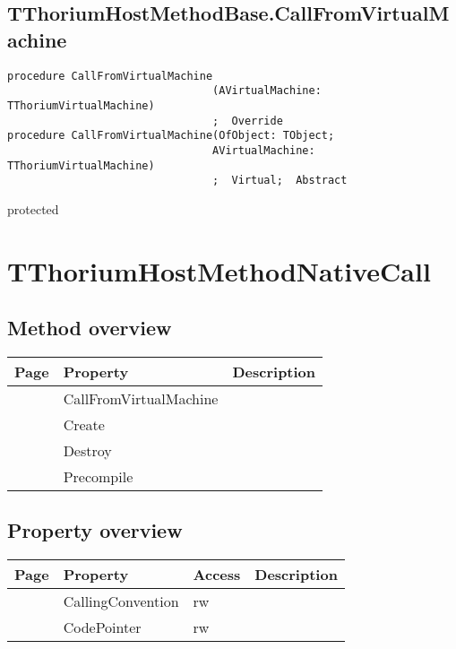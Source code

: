 \subsection{TThoriumHostMethodBase.CallFromVirtualMachine}
\label{thoriumcore:thorium:tthoriumhostmethodbase:callfromvirtualmachine}
\begin{FPCList}
\Synopsis
\Declaration 

\begin{verbatim}
procedure CallFromVirtualMachine
                                (AVirtualMachine: TThoriumVirtualMachine)
                                ;  Override
procedure CallFromVirtualMachine(OfObject: TObject;
                                AVirtualMachine: TThoriumVirtualMachine)
                                ;  Virtual;  Abstract
\end{verbatim}
\Visibility
protected
\Description
\Errors
\end{FPCList}
\section{TThoriumHostMethodNativeCall}
\label{thoriumcore:thorium:tthoriumhostmethodnativecall}
\subsection{Method overview}
\label{thoriumcore:thorium:tthoriumhostmethodnativecall:methods}
\begin{tabularx}{\textwidth}{llX}
Page & Property & Description  \\ \hline
\pageref{thoriumcore:thorium:tthoriumhostmethodnativecall:callfromvirtualmachine} & CallFromVirtualMachine  &  \\
\pageref{thoriumcore:thorium:tthoriumhostmethodnativecall:create} & Create  &  \\
\pageref{thoriumcore:thorium:tthoriumhostmethodnativecall:destroy} & Destroy  &  \\
\pageref{thoriumcore:thorium:tthoriumhostmethodnativecall:precompile} & Precompile  &  \\
\hline
\end{tabularx}
\subsection{Property overview}
\label{thoriumcore:thorium:tthoriumhostmethodnativecall:properties}
\begin{tabularx}{\textwidth}{lllX}
Page & Property & Access & Description \\ \hline
\pageref{thoriumcore:thorium:tthoriumhostmethodnativecall:callingconvention} & CallingConvention & rw &  \\
\pageref{thoriumcore:thorium:tthoriumhostmethodnativecall:codepointer} & CodePointer & rw &  \\
\hline
\end{tabularx}
